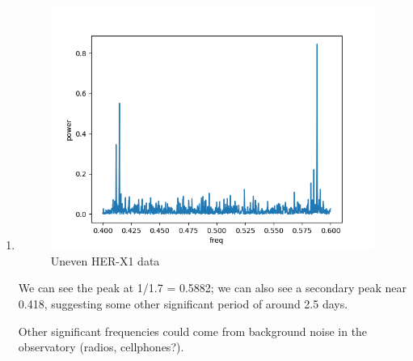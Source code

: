 \documentclass[a4paper,11pt,english]{article}
\begin{document}
\begin{enumerate}
\begin{enumerate}
	\item 	
	\begin{figure}[H]
		\includegraphics[width=\linewidth]{ls/uneven}
		\caption{Uneven HER-X1 data}
	\end{figure}
	\par We can see the peak at 1/1.7 = 0.5882; we can also see a secondary peak near 0.418, suggesting some other significant period of around 2.5 days. 
	\par Other significant frequencies could come from background noise in the observatory (radios, cellphones?).
	\end{enumerate}
\end{enumerate}
\end{document}

